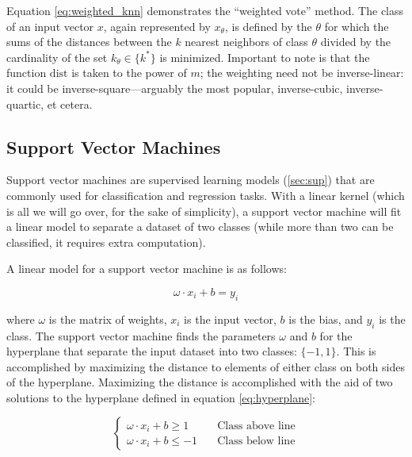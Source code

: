 \documentclass{comjnl}
\numberwithin{equation}{subsection}
\begin{document}
            \noindent Equation \eqref{eq:weighted_knn} demonstrates the ``weighted vote'' method.
            The class of an input vector $x$, again represented by $x_{\theta}$, is defined by the
            $\theta$ for which the sums of the distances between the $k$ nearest neighbors of class
            $\theta$ divided by the cardinality of the set $k_{\theta} \in \{k^{*}\}$ is minimized.
            Important to note is that the function $\text{dist}$ is taken to the power of $m$; the
            weighting need not be inverse-linear: it could be inverse-square---arguably the most
            popular, inverse-cubic, inverse-quartic, et cetera.

        \subsection{Support Vector Machines}\label{subsec:svm}

            Support vector machines are supervised learning models (\ref{sec:sup}) that are commonly
            used for classification and regression tasks. With a linear kernel (which is all we
            will go over, for the sake of simplicity), a support vector machine will fit a linear
            model to separate a dataset of two classes (while more than two can be classified, it
            requires extra computation).

            A linear model for a support vector machine is as follows:

            \begin{equation}\label{eq:hyperplane}
                \omega \cdot x_i + b = y_i
            \end{equation}

            \noindent where $\omega$ is the matrix of weights, $x_i$ is the input vector, $b$ is the
            bias, and $y_i$ is the class. The support vector machine finds the parameters $\omega$ and $b$ for the
            hyperplane that separate the input dataset into two classes: $\{-1,1\}$. This is accomplished by
            maximizing the distance to elements of either class on both sides of the hyperplane. Maximizing
            the distance is accomplished with the aid of two solutions to the hyperplane defined in
            equation \eqref{eq:hyperplane}:

            \begin{equation}\label{eq:sepclass}
                \begin{cases}
                    \omega \cdot x_i + b \geq 1 & \quad \text{Class above line} \\
                    \omega \cdot x_i + b \leq -1 & \quad \text{Class below line}
                \end{cases}
            \end{equation}
\end{document}
